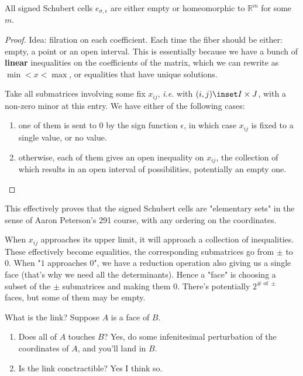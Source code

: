\documentclass{article}
\begin{document}
\begin{lemma}
    All signed Schubert cells $e_{\sigma, \epsilon}$ are either empty or homeomorphic to $\mathbb{R}^m$ for some $m$.
\end{lemma}
\begin{proof}
    Idea: filration on each coefficient. Each time the fiber should be either: empty, a point or an open interval.
    This is essentially because we have a bunch of \textbf{linear} inequalities on the coefficients of the matrix, which we can rewrite as $\min < x < \max$, or equalities that have unique solutions.

    Take all submatrices involving some fix $x_{ij}$, \textit{i.e.} with $(i,j)\inset I \times J$, with a non-zero minor at this entry. We have either of the following cases:
    \begin{enumerate}
        \item one of them is sent to $0$ by the sign function $\epsilon$, in which case $x_{ij}$ is fixed to a single value, or no value.
        \item otherwise, each of them gives an open inequality on $x_{ij}$, the collection of which results in an open interval of possibilities, potentially an empty one.
    \end{enumerate} 
\end{proof}

This effectively proves that the signed Schubert cells are "elementary sets" in the sense of Aaron Peterson's 291 course, with any ordering on the coordinates.

\begin{lemma}
    When $x_{ij}$ approaches its upper limit, it will approach a collection of inequalities. These effectively become equalities, the corresponding submatrices go from $\pm$ to $0$.
    When "$1$ approaches $0$", we have a reduction operation also giving us a single face (that's why we need all the determinants).
    Hence a "face" is choosing a subset of the $\pm$ submatrices and making them $0$.
    There's potentially $2^{\# \text{ of } \pm}$ faces, but some of them may be empty.
\end{lemma}

What is the link? Suppose $A$ is a face of $B$.
\begin{enumerate}
    \item Does all of $A$ touches $B$? Yes, do some infenitesimal perturbation of the coordinates of $A$, and you'll land in $B$.
    \item Is the link conctractible? Yes I think so.
\end{enumerate}
\end{document}
